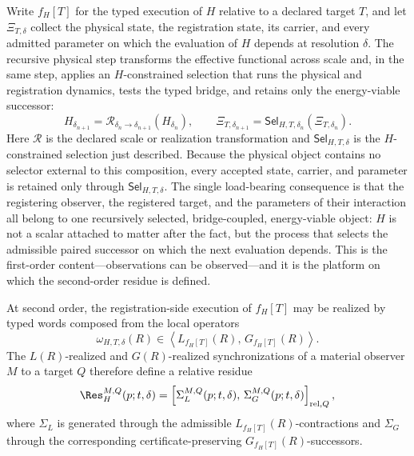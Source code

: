 \documentclass[10pt,twoside,a5paper]{article}
\theoremstyle{definition}
\begin{document}
Write $f_H[T]$ for the typed execution of $H$ relative to a declared target
$T$, and let $\Xi_{T,\delta}$ collect the physical state, the registration
state, its carrier, and every admitted parameter on which the evaluation of
$H$ depends at resolution $\delta$. The recursive physical step transforms the
effective functional across scale and, in the same step, applies an
$H$-constrained selection that runs the physical and registration dynamics,
tests the typed bridge, and retains only the energy-viable successor:
\begin{equation}
H_{\delta_{n+1}}
=
\mathcal R_{\delta_n\rightarrow\delta_{n+1}}
\!\left(H_{\delta_n}\right),
\qquad
\Xi_{T,\delta_{n+1}}
=
\mathsf{Sel}_{H,T,\delta_n}
\!\left(\Xi_{T,\delta_n}\right).
\label{eq:H-recursive-selection}
\end{equation}
Here $\mathcal R$ is the declared scale or realization transformation and
$\mathsf{Sel}_{H,T,\delta}$ is the $H$-constrained selection just described.
Because the physical object contains no selector external to this composition,
every accepted state, carrier, and parameter is retained only through
$\mathsf{Sel}_{H,T,\delta}$. The single load-bearing consequence is that the
registering observer, the registered target, and the parameters of their
interaction all belong to one recursively selected, bridge-coupled,
energy-viable object: $H$ is not a scalar attached to matter after the fact,
but the process that selects the admissible paired successor on which the next
evaluation depends. This is the first-order content---observations can be
observed---and it is the platform on which the second-order residue is defined.

At second order, the registration-side execution of $f_H[T]$ may be realized
by typed words composed from the local operators
\[
\omega_{H,T,\delta}(R)
\in
\left\langle
L_{f_H[T]}(R),\,
G_{f_H[T]}(R)
\right\rangle .
\]
The $L(R)$-realized and $G(R)$-realized synchronizations of a material
observer $M$ to a target $Q$ therefore define a relative residue
\begin{equation}
\Res_{H}^{M,Q}(p;t,\delta)
=
\left[
\Sigma_{L}^{M,Q}(p;t,\delta),\,
\Sigma_{G}^{M,Q}(p;t,\delta)
\right]_{\mathrm{rel},Q},
\label{eq:H-observability-residue}
\end{equation}
where $\Sigma_L$ is generated through the admissible
$L_{f_H[T]}(R)$-contractions and $\Sigma_G$ through the corresponding
certificate-preserving $G_{f_H[T]}(R)$-successors.
\end{document}
